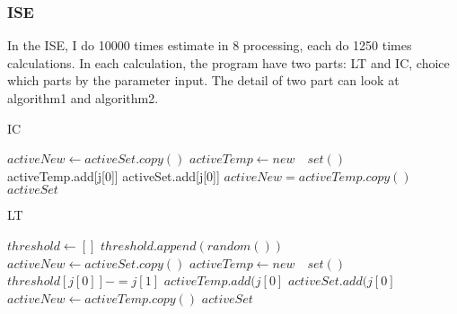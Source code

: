 \documentclass[conference,compsoc]{IEEEtran}
\begin{document}
    \subsubsection{ISE}
      In the ISE, I do 10000 times estimate in 8 processing, each do 1250 times calculations. In each calculation, the program have two parts: LT and IC, choice which parts by the parameter input. The detail of two part can look at algorithm1 and algorithm2.
      \begin{algorithm}
        \caption{IC}
        \begin{algorithmic}[1]
            \State $activeNew\gets activeSet.copy()$
              \State $activeTemp \gets new\quad set()$
                      \State activeTemp.add[j[0]]
                      \State activeSet.add[j[0]]
                    \EndIf
                  \EndIf
                \EndFor
              \EndFor
              \State $activeNew = activeTemp.copy()$
            \EndWhile
            \Return $activeSet$
          \EndFunction
        \end{algorithmic}
      \end{algorithm}

      \begin{algorithm}
        \caption{LT}
        \begin{algorithmic}[1]
            \State $threshold\gets []$
              \State $threshold.append(random())$
            \EndFor
            \State $activeNew\gets activeSet.copy()$
              \State $activeTemp\gets new\quad set()$
                    \State $threshold[j[0]]-=j[1]$
                      \State $activeTemp.add(j[0]$
                      \State $activeSet.add(j[0]$
                    \EndIf
                  \EndIf
                \EndFor
              \EndFor
              \State$activeNew\gets activeTemp.copy()$
            \EndWhile
            \Return $activeSet$
          \EndFunction
        \end{algorithmic}
      \end{algorithm}
\end{document}
